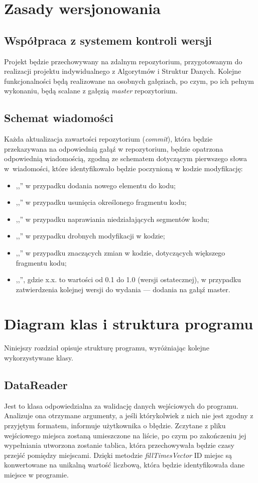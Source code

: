 \documentclass[12pt,a4paper]{article}
\begin{document}
\section{Zasady wersjonowania}
\subsection{Współpraca z systemem kontroli wersji}
Projekt będzie przechowywany na zdalnym repozytorium, przygotowanym do realizacji projektu indywidualnego z Algorytmów i Struktur Danych. Kolejne funkcjonalności będą realizowane na osobnych gałęziach, po czym, po ich pełnym wykonaniu, będą scalane z gałęzią \textsl{master} repozytorium.
\subsection{Schemat wiadomości}
Każda aktualizacja zawartości repozytorium (\textsl{commit}), która będzie przekazywana na odpowiednią gałąź w repozytorium, będzie opatrzona odpowiednią wiadomością, zgodną ze schematem dotyczącym pierwszego słowa w~wiadomości, które identyfikowało będzie poczynioną w kodzie modyfikację:
\begin{itemize}
\item ,,'' w przypadku dodania nowego elementu do kodu;
\item ,,'' w przypadku usunięcia określonego fragmentu kodu;
\item ,,'' w przypadku naprawiania niedziałających segmentów kodu;
\item ,,'' w przypadku drobnych modyfikacji w kodzie;
\item ,,'' w przypadku znaczących zmian w kodzie, dotyczących większego fragmentu kodu;
\item ,,'', gdzie x.x. to wartości od 0.1 do 1.0 (wersji ostatecznej), w przypadku zatwierdzenia kolejnej wersji do wydania --- dodania na gałąź master.
\end{itemize}
\section{Diagram klas i struktura programu}
Niniejszy rozdział opisuje strukturę programu, wyróżniając kolejne wykorzystywane klasy.
\subsection{DataReader}
Jest to klasa odpowiedzialna za walidację danych wejściowych do programu. Analizuje ona otrzymane argumenty, a jeśli którykolwiek z nich nie jest zgodny z przyjętym formatem, informuje użytkownika o błędzie. Zczytane z pliku wejściowego miejsca zostaną umieszczone na liście, po czym po zakończeniu jej wypełniania utworzona zostanie tablica, która przechowywała będzie czasy przejść pomiędzy miejscami. Dzięki metodzie \textsl{fillTimesVector} ID miejsc są konwertowane na unikalną wartość liczbową, która będzie identyfikowała dane miejsce w programie.
\end{document}
